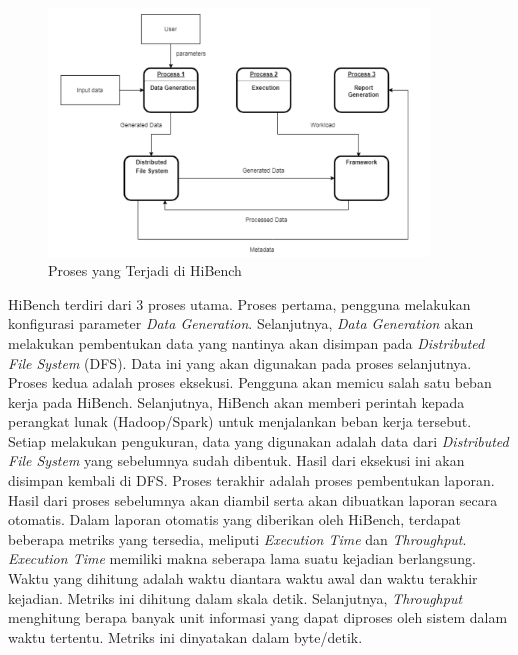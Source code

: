 \begin{figure}[h]
    \centering
    \includegraphics[width=0.9\textwidth]{figures/ch02/hibench-flow}
    \caption{Proses yang Terjadi di HiBench \cite{barosenAnalysisComparisonInterfacing2018}}
    \label{fig:hibench-process-flow}
\end{figure}

HiBench terdiri dari 3 proses utama. Proses pertama, pengguna melakukan konfigurasi parameter \textit{Data Generation}. Selanjutnya, \textit{Data Generation} akan melakukan pembentukan data yang nantinya akan disimpan pada \textit{Distributed File System} (DFS). Data ini yang akan digunakan pada proses selanjutnya. Proses kedua adalah proses eksekusi. Pengguna akan memicu salah satu beban kerja pada HiBench. Selanjutnya, HiBench akan memberi perintah kepada perangkat lunak (Hadoop/Spark) untuk menjalankan beban kerja tersebut. Setiap melakukan pengukuran, data yang digunakan adalah data dari \textit{Distributed File System} yang sebelumnya sudah dibentuk. Hasil dari eksekusi ini akan disimpan kembali di DFS. Proses terakhir adalah proses pembentukan laporan. Hasil dari proses sebelumnya akan diambil serta akan dibuatkan laporan secara otomatis.
Dalam laporan otomatis yang diberikan oleh HiBench, terdapat beberapa metriks yang tersedia, meliputi \textit{Execution Time} dan \textit{Throughput}. \textit{Execution Time} memiliki makna seberapa lama suatu kejadian berlangsung. Waktu yang dihitung adalah waktu diantara waktu awal dan waktu terakhir kejadian. Metriks ini dihitung dalam skala detik. Selanjutnya, \textit{Throughput} menghitung berapa banyak unit informasi yang dapat diproses oleh sistem dalam waktu tertentu. Metriks ini dinyatakan dalam byte/detik.

